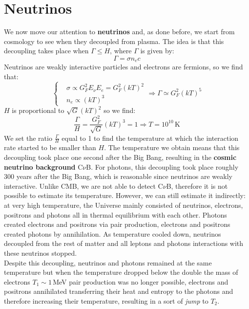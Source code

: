 \documentclass[10.75pt,a4paper,openright,bottom=2cm]{article}
\begin{document}
\section{Neutrinos}
We now move our attention to \textbf{neutrinos} and, as done before, we start from cosmology to see when they decoupled from plasma. The idea is that this decoupling takes place when $\Gamma\le H$, where $\Gamma$ is given by:
\[
\Gamma=\sigma n_ec
\]
Neutrinos are weakly interactive particles and electrons are fermions, so we find that:
\[
\left\{
\begin{aligned}
&\sigma\propto G_F^2E_\nu E_e=G_F^2(kT)^2\\
&n_e\propto(kT)^3
\end{aligned}
\right.
\Rightarrow\Gamma\simeq G_F^2(kT)^5
\]
$H$ is proportional to $\sqrt{G}(kT)^2$ so we find:
\[
\frac{\Gamma}{H}=\frac{G_F^2}{\sqrt{G}}(kT)^3=1\Rightarrow T=10^{10}\,\text{K}
\]
We set the ratio $\frac{\Gamma}{H}$ equal to 1 to find the temperature at which the interaction rate started to be smaller than $H$. The temperature we obtain means that this decoupling took place one second after the Big Bang, resulting in the \textbf{cosmic neutrino background} C$\nu$B. For photons, this decoupling took place roughly 300 years after the Big Bang, which is reasonable since neutrinos are weakly interactive. Unlike CMB, we are not able to detect C$\nu$B, therefore it is not possible to estimate its temperature. However, we can still estimate it indirectly: at very high temperature, the Universe mainly consisted of neutrinos, electrons, positrons and photons all in thermal equilibrium with each other. Photons created electrons and positrons via pair production, electrons and positrons created photons by annihilation. As temperature cooled down, neutrinos decoupled from the rest of matter and all leptons and photons interactions with these neutrinos stopped.\\
Despite this decoupling, neutrinos and photons remained at the same temperature but when the temperature dropped below the double the mass of electrons $T_1\sim1$\,MeV pair production was no longer possible, electrons and positrons annihilated transferring their heat and entropy to the photons and therefore increasing their temperature, resulting in a sort of \textit{jump} to $T_2$.
\end{document}
